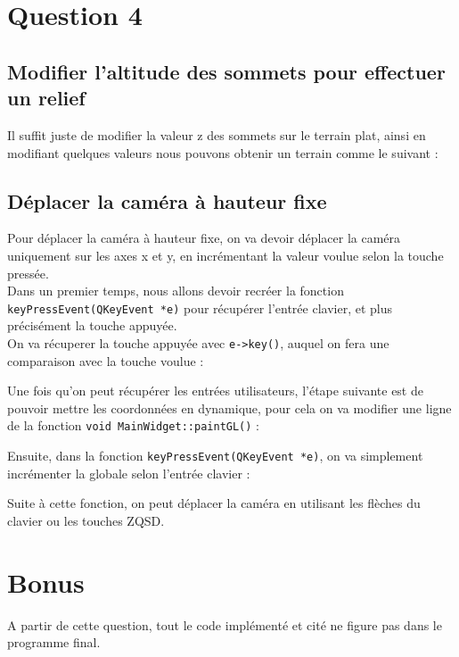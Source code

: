 \documentclass[a4paper,11pt]{report}
\begin{document}
	\section{Question 4}
	\subsection{Modifier l'altitude des sommets pour effectuer un relief}
	Il suffit juste de modifier la valeur z des sommets sur le terrain plat, ainsi en modifiant quelques valeurs nous pouvons obtenir un terrain comme le suivant :
	
	\subsection{Déplacer la caméra à hauteur fixe}
	Pour déplacer la caméra à hauteur fixe, on va devoir déplacer la caméra uniquement sur les axes x et y, en incrémentant la valeur voulue selon la touche pressée.\\
	Dans un premier temps, nous allons devoir recréer la fonction \lstinline{keyPressEvent(QKeyEvent *e)} pour récupérer l'entrée clavier, et plus précisément la touche appuyée.\\
	On va récuperer la touche appuyée avec \lstinline{e->key()}, auquel on fera une comparaison avec la touche voulue :
	
	
	\pagebreak
	
	Une fois qu'on peut récupérer les entrées utilisateurs, l'étape suivante est de pouvoir mettre les coordonnées en dynamique, pour cela on va modifier une ligne de la fonction \lstinline{void MainWidget::paintGL()} :
	
	Ensuite, dans la fonction \lstinline{keyPressEvent(QKeyEvent *e)}, on va simplement incrémenter la globale selon l'entrée clavier :
	
	Suite à cette fonction, on peut déplacer la caméra en utilisant les flèches du clavier ou les touches ZQSD.
	
	\pagebreak
	\section{Bonus}
	A partir de cette question, tout le code implémenté et cité ne figure pas dans le programme final.
\end{document}
